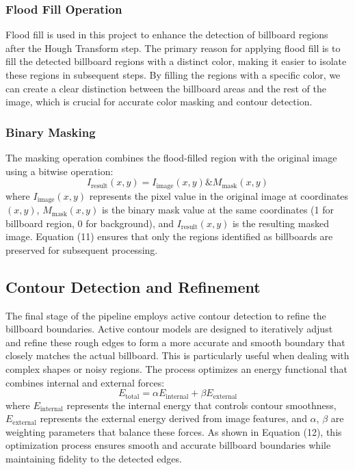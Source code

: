 \documentclass[12pt]{article}
\begin{document}
\subsubsection{Flood Fill Operation}
Flood fill is used in this project to enhance the detection of billboard regions after the Hough Transform step. The primary reason for applying flood fill is to fill the detected billboard regions with a distinct color, making it easier to isolate these regions in subsequent steps. By filling the regions with a specific color, we can create a clear distinction between the billboard areas and the rest of the image, which is crucial for accurate color masking and contour detection.

\subsubsection{Binary Masking}
The masking operation combines the flood-filled region with the original image using a bitwise operation:
\begin{equation}
I_{\text{result}}(x, y) = I_{\text{image}}(x, y) \& M_{\text{mask}}(x, y)
\end{equation}
where $I_{\text{image}}(x, y)$ represents the pixel value in the original image at coordinates $(x, y)$, $M_{\text{mask}}(x, y)$ is the binary mask value at the same coordinates (1 for billboard region, 0 for background), and $I_{\text{result}}(x, y)$ is the resulting masked image. Equation (11) ensures that only the regions identified as billboards are preserved for subsequent processing.

\subsection{Contour Detection and Refinement}
The final stage of the pipeline employs active contour\cite{ActiveContour} detection to refine the billboard boundaries. Active contour models are designed to iteratively adjust and refine these rough edges to form a more accurate and smooth boundary that closely matches the actual billboard. This is particularly useful when dealing with complex shapes or noisy regions. The process optimizes an energy functional that combines internal and external forces:
\begin{equation}
E_{\text{total}} = \alpha E_{\text{internal}} + \beta E_{\text{external}}
\end{equation}
where $E_{\text{internal}}$ represents the internal energy that controls contour smoothness, $E_{\text{external}}$ represents the external energy derived from image features, and $\alpha$, $\beta$ are weighting parameters that balance these forces. As shown in Equation (12), this optimization process ensures smooth and accurate billboard boundaries while maintaining fidelity to the detected edges.
\end{document}
